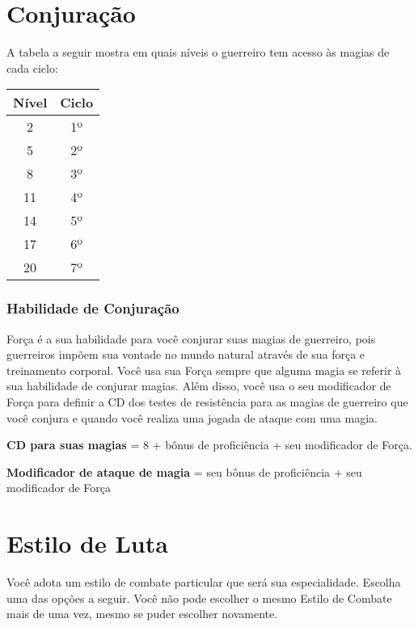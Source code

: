 \documentclass{RPG_Adventure}[2021/10/20]
\begin{document}
\begin{multicols}{2}
\section*{Conjuração}%

A tabela a seguir mostra em quais níveis o guerreiro tem acesso às magias de
cada ciclo:

\begin{center}
\begin{tabular}{|||c||c|||}
    \hline
    \textbf{Nível} & \textbf{Ciclo} \\
    \hline
    2 & 1º \\
    \hline
    5 & 2º \\
    \hline
    8 & 3º \\
    \hline
    11 & 4º \\
    \hline
    14 & 5º \\
    \hline
    17 & 6º \\
    \hline
    20 & 7º \\
    \hline
\end{tabular}
\end{center}

\subsubsection*{Habilidade de Conjuração}%

Força é a sua habilidade para você conjurar suas magias de guerreiro, pois
guerreiros impõem sua vontade no mundo natural através de sua força e
treinamento corporal. Você usa sua Força sempre que alguma magia se referir à
sua habilidade de conjurar magias. Além disso, você usa o seu modificador de
Força para definir a CD dos testes de resistência para as magias de guerreiro
que você conjura e quando você realiza uma jogada de ataque com uma magia.

\begin{center}
\textbf{CD para suas magias} = 8 + bônus de proficiência + seu modificador de
Força. \nl

\textbf{Modificador de ataque de magia} = seu bônus de proficiência + seu
modificador de Força
\end{center}

\section*{Estilo de Luta}%

Você adota um estilo de combate particular que será sua especialidade. Escolha
uma das opções a seguir. Você não pode escolher o mesmo Estilo de Combate mais
de uma vez, mesmo se puder escolher novamente.


\end{multicols}
\end{document}

